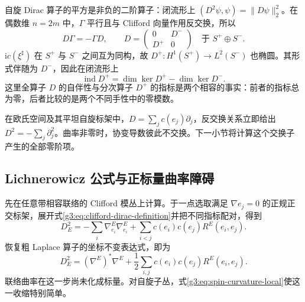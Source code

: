 自旋 Dirac 算子的平方是非负的二阶算子：闭流形上
\((D^2\psi,\psi)=\|D\psi\|_2^2\)。在偶数维 \(n=2m\) 中，\(\Gamma\) 平行且与 Clifford 向量作用反交换，所以
\[
	D\Gamma=-\Gamma D,\qquad
	D=\begin{pmatrix}0&D^-\\D^+&0\end{pmatrix}
	\quad\text{于 }S^+\oplus S^-.
\]
\(\mathrm i c(\xi^\sharp)\) 在 \(S^+\) 与 \(S^-\) 之间互为同构，故 \(D^+:H^1(S^+)\to L^2(S^-)\) 也椭圆。其形式伴随为 \(D^-\)，因此在闭流形上
\begin{equation}\label{g3:eq:spin-analytic-index}
	\operatorname{ind}D^+=\dim\ker D^+-\dim\ker D^-.
\end{equation}
这里全算子 \(D\) 的自伴性与分次算子 \(D^+\) 的指标是两个相容的事实：前者的指标总为零，后者比较的是两个不同手性中的零模数。

\ProseParagraphBreak

在欧氏空间及其平坦自旋标架中，\(D=\sum_jc(e_j)\partial_j\)，反交换关系立即给出 \(D^2=-\sum_j\partial_j^2\)。曲率非零时，协变导数彼此不交换。下一小节将计算这个交换子产生的全部零阶项。

\subsection{Lichnerowicz 公式与正标量曲率障碍}
\label{g3:subsec:1703:04}
先在任意带相容联络的 Clifford 模丛上计算。于一点选取满足 \(\nabla e_j=0\) 的正规正交标架，展开式\eqref{g3:eq:clifford-dirac-definition}并把不同指标配对，得到
\[
	D_E^2=-\sum_i\nabla^E_{e_i}\nabla^E_{e_i}
	+\sum_{i<j}c(e_i)c(e_j)R^E(e_i,e_j).
\]
恢复粗 Laplace 算子的坐标不变表达式，即为
\begin{equation}\label{g3:eq:dirac-square-general-curvature}
	D_E^2=(\nabla^E)^*\nabla^E
	+\frac12\sum_{i,j}c(e_i)c(e_j)R^E(e_i,e_j).
\end{equation}
联络曲率在这一步尚未化成标量。对自旋子丛，式\eqref{g3:eq:spin-curvature-local}使这一收缩特别简单。

